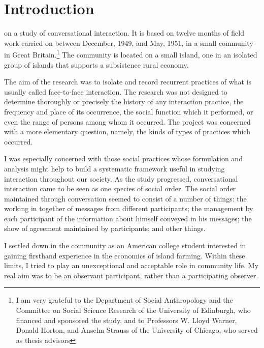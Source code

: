 \documentclass[twoside,symmetric,nobib,justified]{tufte-book}
\let\oldchapter\chapter
\def\chapter{%
  \setcounter{footnote}{0}%
  \oldchapter
}
\begin{document}


\chapter[INTRODUCTION]{Introduction}
\label{ch:Introduction}

 on a study of conversational interaction. It is based
on twelve months of field work carried on between December, 1949, and
May, 1951, in a small community in Great Britain.\footnote{I am very
  grateful to the Department of Social Anthropology and the Committee on
  Social Science Research of the University of Edinburgh, who financed
  and sponsored the study, and to Professors W. Lloyd Warner, Donald
  Horton, and Anselm Strauss of the University of Chicago, who served as
  thesis advisors} The community is located on a small island, one in an
isolated group of islands that supports a subsistence rural economy.

The aim of the research was to isolate and record recurrent practices of
what is usually called face-to-face interaction. The research was not
designed to determine thoroughly or precisely the history of any
interaction practice, the frequency and place of its occurrence, the
social function which it performed, or even the range of persons among
whom it occurred. The project was concerned with a more elementary
question, namely, the kinds of types of practices which occurred.

I was especially concerned with those social practices whose formulation
and analysis might help to build a systematic framework useful in
studying interaction throughout our society. As the study progressed,
conversational interaction came to be seen as one species of social
order. The social order maintained through conversation seemed to
consist of a number of things: the working in together of messages from
different participants; the management by each participant of the
information about himself conveyed in his messages; the show of
agreement maintained by participants; and other things.

I settled down in the community as an American college student
interested in gaining firsthand experience in the economics of island
farming. Within these limits, I tried to play an unexceptional and
acceptable role in community life. My real aim was to be an observant
participant, rather than a participating observer.
\end{document}
